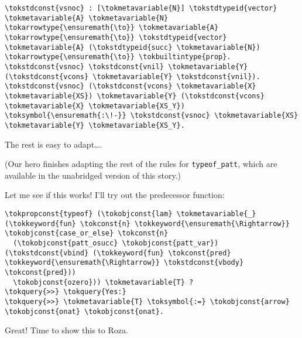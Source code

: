 \begin{verbatim}
\tokstdconst{vsnoc} : [\tokmetavariable{N}] \tokstdtypeid{vector} \tokmetavariable{A} \tokmetavariable{N} \tokarrowtype{\ensuremath{\to}} \tokmetavariable{A} \tokarrowtype{\ensuremath{\to}} \tokstdtypeid{vector} \tokmetavariable{A} (\tokstdtypeid{succ} \tokmetavariable{N}) \tokarrowtype{\ensuremath{\to}} \tokbuiltintype{prop}.
\tokstdconst{vsnoc} \tokstdconst{vnil} \tokmetavariable{Y} (\tokstdconst{vcons} \tokmetavariable{Y} \tokstdconst{vnil}).
\tokstdconst{vsnoc} (\tokstdconst{vcons} \tokmetavariable{X} \tokmetavariable{XS}) \tokmetavariable{Y} (\tokstdconst{vcons} \tokmetavariable{X} \tokmetavariable{XS_Y}) \toksymbol{\ensuremath{:\!-}} \tokstdconst{vsnoc} \tokmetavariable{XS} \tokmetavariable{Y} \tokmetavariable{XS_Y}.
\end{verbatim}

The rest is easy to adapt\ldots{}.

\begin{scenecomment}
(Our hero finishes adapting the rest of the rules for \texttt{typeof\_patt},
which are available in the unabridged version of this story.)
\end{scenecomment}

Let me see if this works! I'll try out the predecessor function:

\begin{verbatim}
\tokpropconst{typeof} (\tokobjconst{lam} \tokmetavariable{_} (\tokkeyword{fun} \tokconst{n} \tokkeyword{\ensuremath{\Rightarrow}} \tokobjconst{case_or_else} \tokconst{n}
  (\tokobjconst{patt_osucc} \tokobjconst{patt_var}) (\tokstdconst{vbind} (\tokkeyword{fun} \tokconst{pred} \tokkeyword{\ensuremath{\Rightarrow}} \tokstdconst{vbody} \tokconst{pred}))
  \tokobjconst{ozero})) \tokmetavariable{T} ?
\tokquery{>>} \tokquery{Yes:}
\tokquery{>>} \tokmetavariable{T} \toksymbol{:=} \tokobjconst{arrow} \tokobjconst{onat} \tokobjconst{onat}.
\end{verbatim}

Great! Time to show this to Roza.

\identDialog
